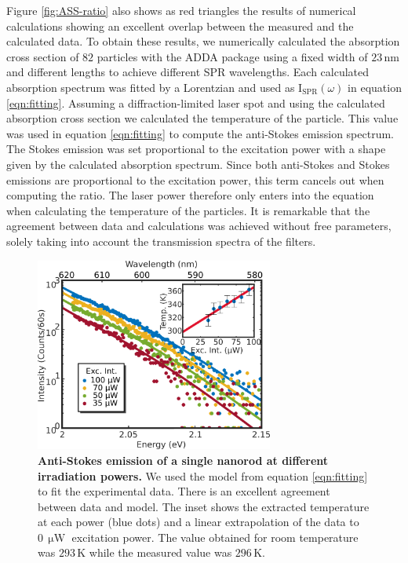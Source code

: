 \documentclass[journal=nalefd,manuscript=letter]{achemso}
\newcommand{\HI}[1]{{#1}} %
\newcommand{\K}{\ensuremath{\,\textrm{K}}}
\newcommand{\nm}{\ensuremath{\,\textrm{nm}}}
\newcommand{\uW}{\ensuremath{\,\upmu\textrm{W}}}
\begin{document}
Figure \ref{fig:ASS-ratio} also shows as red triangles the results of numerical calculations \HI{showing
an excellent overlap between the measured and the calculated data.
To obtain these results, we numerically calculated the 
absorption cross section of \HI{$82$} particles 
with the ADDA package\cite{Yurkin2011} using a fixed width of $23\nm$ and different 
lengths to achieve different SPR wavelengths.}
Each calculated absorption spectrum was 
fitted by a Lorentzian and used as $\textrm{I}_{\textrm{SPR}}(\omega)$ in equation
\ref{eqn:fitting}. Assuming a diffraction-limited laser spot and using the
calculated absorption cross section we calculated the temperature of
the particle. This value was used in equation \ref{eqn:fitting} to compute the
anti-Stokes emission spectrum. The Stokes emission was set proportional to the
excitation power  with a shape given by the calculated absorption spectrum. Since both
anti-Stokes and Stokes emissions are proportional to the excitation power, this
term cancels out when computing the ratio. The laser power therefore only enters
into the equation when calculating the temperature of the particles. It is
remarkable that the agreement between data and calculations was achieved
without free parameters, solely taking into account the transmission spectra of
the filters.

\begin{figure}[tp] \centering
\includegraphics[width=78.4mm]{Figures/03_Fit_Of_AS/03_Log_Fit_AS.png}
\caption{\textbf{Anti-Stokes emission of a single nanorod at different irradiation powers.} We used 
the model from equation \ref{eqn:fitting} to fit the experimental data. 
There is an excellent agreement between data and model. The inset shows the extracted
temperature at each power (blue dots) and a linear 
extrapolation of the data to $0\uW$ excitation power.
The value obtained for room temperature was $293\K$ while the measured value was
$296\K$.}
	\label{fig:AS_in_Log}
\end{figure}
\end{document}
